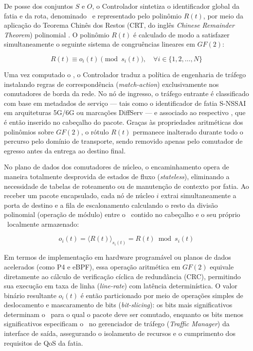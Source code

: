 De posse dos conjuntos $S$ e $O$, o Controlador sintetiza o identificador global da fatia e da rota, denominado \routeID\ e representado pelo polinômio $R(t)$, por meio da aplicação do Teorema Chinês dos Restos (CRT, do inglês \textit{Chinese Remainder Theorem}) polinomial \cite{Shoup:2009, dominicini2020}. O polinômio $R(t)$ é calculado de modo a satisfazer simultaneamente o seguinte sistema de congruências lineares em $GF(2)$:

\begin{equation}
R(t) \equiv o_i(t) \pmod{s_i(t)}, \quad \forall i \in \{1, 2, \ldots, N\}
\end{equation}

Uma vez computado o \routeID, o Controlador traduz a política de engenharia de tráfego instalando regras de correspondência (\textit{match-action}) exclusivamente nos comutadores de borda da rede. No nó de ingresso, o tráfego entrante é classificado com base em metadados de serviço --- tais como o identificador de fatia S-NSSAI em arquiteturas 5G/6G ou marcações DiffServ --- e associado ao respectivo \routeID, que é então inserido no cabeçalho do pacote. Graças às propriedades aritméticas dos polinômios sobre $GF(2)$, o rótulo $R(t)$ permanece inalterado durante todo o percurso pelo domínio de transporte, sendo removido apenas pelo comutador de egresso antes da entrega ao destino final.

No plano de dados dos comutadores de núcleo, o encaminhamento opera de maneira totalmente desprovida de estados de fluxo (\textit{stateless}), eliminando a necessidade de tabelas de roteamento ou de manutenção de contexto por fatia. Ao receber um pacote encapsulado, cada nó de núcleo $i$ extrai simultaneamente a porta de destino e a fila de escalonamento calculando o resto da divisão polinomial (operação de módulo) entre o \routeID\ contido no cabeçalho e o seu próprio \nodeID\ localmente armazenado:

\begin{equation}
o_i(t) = \langle R(t) \rangle_{s_i(t)} = R(t) \bmod s_i(t)
\end{equation}

Em termos de implementação em hardware programável ou planos de dados acelerados (como P4 e eBPF), essa operação aritmética em $GF(2)$ equivale diretamente ao cálculo de verificação cíclica de redundância (CRC), permitindo sua execução em taxa de linha (\textit{line-rate}) com latência determinística. O valor binário resultante $o_i(t)$ é então particionado por meio de operações simples de deslocamento e mascaramento de bits (\textit{bit-slicing}): os bits mais significativos determinam o \portID\ para o qual o pacote deve ser comutado, enquanto os bits menos significativos especificam o \qID\ no gerenciador de tráfego (\textit{Traffic Manager}) da interface de saída, assegurando o isolamento de recursos e o cumprimento dos requisitos de QoS da fatia.

